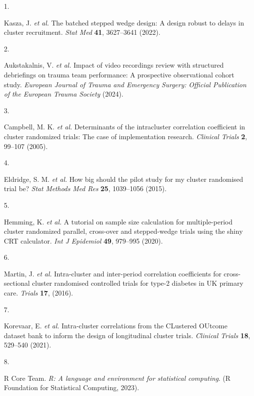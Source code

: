 \documentclass[
]{scrartcl}
\newlength{\cslhangindent}
\newlength{\csllabelwidth}
\newlength{\cslentryspacingunit} %
\newenvironment{CSLReferences}[2] %
 {%
  \setlength{\parindent}{0pt}
  \ifodd #1
  \let\oldpar\par
  \def\par{\hangindent=\cslhangindent\oldpar}
  \fi
  \setlength{\parskip}{#2\cslentryspacingunit}
 }%
 {}
\newcommand{\CSLLeftMargin}[1]{\parbox[t]{\csllabelwidth}{#1}}
\newcommand{\CSLRightInline}[1]{\parbox[t]{\linewidth - \csllabelwidth}{#1}\break}
\begin{document}
\hypertarget{refs}{}
\begin{CSLReferences}{0}{0}
\leavevmode{}%
\CSLLeftMargin{1. }%
\CSLRightInline{Kasza, J. \emph{et al.} The batched stepped wedge
design: A design robust to delays in cluster recruitment. \emph{Stat
Med} \textbf{41}, 3627--3641 (2022).}

\leavevmode{}%
\CSLLeftMargin{2. }%
\CSLRightInline{Aukstakalnis, V. \emph{et al.} Impact of video
recordings review with structured debriefings on trauma team
performance: A prospective observational cohort study. \emph{European
Journal of Trauma and Emergency Surgery: Official Publication of the
European Trauma Society} (2024).}

\leavevmode{}%
\CSLLeftMargin{3. }%
\CSLRightInline{Campbell, M. K. \emph{et al.} Determinants of the
intracluster correlation coefficient in cluster randomized trials: The
case of implementation research. \emph{Clinical Trials} \textbf{2},
99--107 (2005).}

\leavevmode{}%
\CSLLeftMargin{4. }%
\CSLRightInline{Eldridge, S. M. \emph{et al.} How big should the pilot
study for my cluster randomised trial be? \emph{Stat Methods Med Res}
\textbf{25}, 1039--1056 (2015).}

\leavevmode{}%
\CSLLeftMargin{5. }%
\CSLRightInline{Hemming, K. \emph{et al.} A tutorial on sample size
calculation for multiple-period cluster randomized parallel, cross-over
and stepped-wedge trials using the shiny CRT calculator. \emph{Int J
Epidemiol} \textbf{49}, 979--995 (2020).}

\leavevmode{}%
\CSLLeftMargin{6. }%
\CSLRightInline{Martin, J. \emph{et al.} Intra-cluster and inter-period
correlation coefficients for cross-sectional cluster randomised
controlled trials for type-2 diabetes in UK primary care. \emph{Trials}
\textbf{17}, (2016).}

\leavevmode{}%
\CSLLeftMargin{7. }%
\CSLRightInline{Korevaar, E. \emph{et al.} Intra-cluster correlations
from the CLustered OUtcome dataset bank to inform the design of
longitudinal cluster trials. \emph{Clinical Trials} \textbf{18},
529--540 (2021).}

\leavevmode{}%
\CSLLeftMargin{8. }%
\CSLRightInline{R Core Team. \emph{R: A language and environment for
statistical computing}. (R Foundation for Statistical Computing, 2023).}


\end{CSLReferences}
\end{document}
